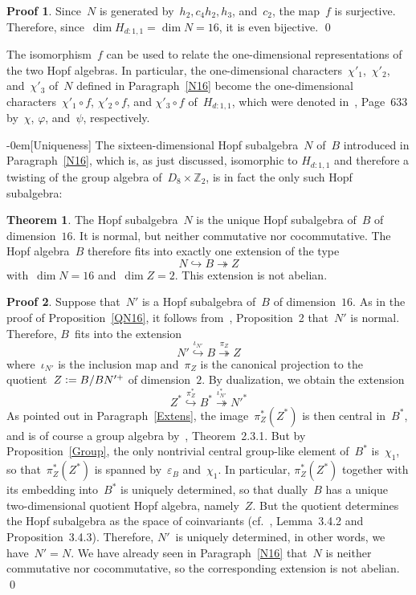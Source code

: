 \documentclass{article}
\makeatletter
\renewcommand{\subsection}{\@startsection{subsection}{2}{0em}%
{\baselineskip}{-0em}{\bfseries\normalsize}}
\numberwithin{equation}{section}
\theoremstyle{definition}
\newtheorem*{pf}{Proof}
\newtheorem*{thm}{Theorem}
\theoremstyle{break}
\newcommand{\dm}{\operatorname{dim}}
\newcommand{\deq}{\vcentcolon =}
\newcommand{\1}{{(1)}}
\newcommand{\2}{{(2)}}
\newcommand{\3}{{(3)}}
\newcommand{\eb}{{\varepsilon_{B}}}
\newcommand{\Z}{{\mathbb Z}}
\makeatother
\begin{document}
\begin{pf}
Since~$N$ is generated by~$h_2, c_4 h_2, h_3$, and~$c_2$, the map~$f$ is surjective. Therefore, since~$\dm H_{d:1,1} = \dm N = 16$, it is even bijective.
\qed
\end{pf}

The isomorphism~$f$ can be used to relate the one-dimensional representations of the two Hopf algebras. In particular, the one-dimensional characters~$\chi'_1$,~$\chi'_2$, and~$\chi'_3$ of~$N$ defined in Paragraph~\ref{N16} become the one-dimensional characters~\mbox{$\chi'_1 \circ f$}, $\chi'_2 \circ f$, and $\chi'_3 \circ f$ of~$H_{d:1,1}$, which were denoted in~\cite{Ka}, Page~633 by~$\chi$, $\varphi$, and~$\psi$, respectively.


\subsection[Uniqueness]{} \label{Proof2by16}
The sixteen-dimensional Hopf subalgebra~$N$ of~$B$ introduced in Paragraph~\ref{N16}, which is, as just discussed, isomorphic to $H_{d:1,1}$ and therefore a twisting of the group algebra of~$D_8 \times \Z_2$, is in fact the only such Hopf subalgebra:
\begin{thm}
The Hopf subalgebra~$N$ is the unique Hopf subalgebra of~$B$ of dimension~$16$. It is normal, but neither commutative nor cocommutative. The Hopf algebra~$B$ therefore fits into exactly one extension of the type
\[N \hookrightarrow B \twoheadrightarrow Z\]
with~$\dm N=16$ and~$\dm Z=2$. This extension is not abelian.
\end{thm}
\begin{pf}
Suppose that~$N'$ is a Hopf subalgebra of~$B$ of dimension~$16$. As in the proof of Proposition~\ref{QN16}, it follows from~\cite{KoMa}, Proposition~2 that~$N'$ is normal. Therefore, $B$~fits into the extension
\[N' \overset{\iota_{N'}}{\hookrightarrow} B \overset{\pi_Z}{\twoheadrightarrow} Z\]
where~$\iota_{N'}$ is the inclusion map and~$\pi_Z$ is the canonical projection to the
quotient~$Z \deq  B/B N'^+$ of dimension~$2$. By dualization, we obtain the extension
\[Z^* \overset{\pi_Z^*}{\hookrightarrow} B^* \overset{\iota_{N'}^*}{\twoheadrightarrow} N'^* \]
As pointed out in Paragraph~\ref{Extens}, the image~$\pi_Z^*(Z^*)$ is then central in~$B^*$, and is of course a group algebra by~\cite{M}, Theorem~2.3.1. But by Proposition~\ref{Group}, the only nontrivial central group-like element of~$B^*$ is~$\chi_1$, so that~$\pi_Z^*(Z^*)$ is spanned by~$\eb$ and~$\chi_1$. In particular, $\pi_Z^*(Z^*)$ together with its embedding into~$B^*$ is uniquely determined, so that dually~$B$ has a unique two-dimensional quotient Hopf algebra, namely~$Z$. But the quotient determines the Hopf subalgebra as the space of coinvariants (cf.~\cite{M}, Lemma~3.4.2 and Proposition~3.4.3). Therefore, $N'$~is uniquely determined, in other words, we have~$N'=N$. We have already seen in Paragraph~\ref{N16} that~$N$ is neither commutative nor cocommutative, so the corresponding extension is not abelian.
\qed
\end{pf}
\end{document}
